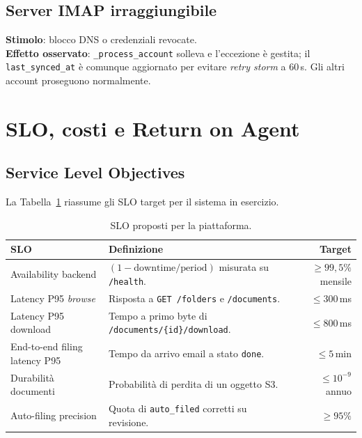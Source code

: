 \documentclass[11pt,a4paper,oneside]{article}
\begin{document}
\subsection{Server IMAP irraggiungibile}
\textbf{Stimolo}: blocco DNS o credenziali revocate. \\
\textbf{Effetto osservato}: \texttt{\_process\_account} solleva e l'eccezione
\`e gestita; il \texttt{last\_synced\_at} \`e comunque aggiornato per evitare
\emph{retry storm} a 60\,s. Gli altri account proseguono normalmente.

\section{SLO, costi e Return on Agent}
\label{sec:cost}

\subsection{Service Level Objectives}
La Tabella~\ref{tab:slo} riassume gli SLO target per il sistema in esercizio.

\begin{table}[ht]
\centering
\small
\begin{tabularx}{\linewidth}{l X r}
\toprule
\textbf{SLO} & \textbf{Definizione} & \textbf{Target} \\
\midrule
Availability backend           & ${(1 - \mathrm{downtime}/\mathrm{period})}$ misurata su \texttt{/health}. & $\geq 99{,}5\%$ mensile \\
Latency P95 \emph{browse}      & Risposta a \texttt{GET /folders} e \texttt{/documents}.                    & $\leq 300$\,ms \\
Latency P95 download           & Tempo a primo byte di \texttt{/documents/\{id\}/download}.                  & $\leq 800$\,ms \\
End-to-end filing latency P95  & Tempo da arrivo email a stato \texttt{done}.                                & $\leq 5$\,min \\
Durabilit\`a documenti         & Probabilit\`a di perdita di un oggetto S3.                                  & $\leq 10^{-9}$ annuo \\
Auto-filing precision          & Quota di \texttt{auto\_filed} corretti su revisione.                       & $\geq 95\%$ \\
\bottomrule
\end{tabularx}
\caption{SLO proposti per la piattaforma.}
\label{tab:slo}
\end{table}
\end{document}
